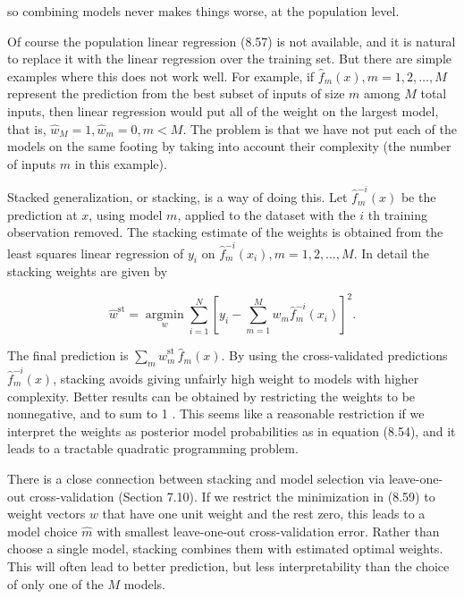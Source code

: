 \documentclass[10pt]{article}
\begin{document}
so combining models never makes things worse, at the population level.

Of course the population linear regression (8.57) is not available, and it is natural to replace it with the linear regression over the training set. But there are simple examples where this does not work well. For example, if $\hat{f}_{m}(x), m=1,2, \ldots, M$ represent the prediction from the best subset of inputs of size $m$ among $M$ total inputs, then linear regression would put all of the weight on the largest model, that is, $\hat{w}_{M}=1, \hat{w}_{m}=0, m<M$. The problem is that we have not put each of the models on the same footing by taking into account their complexity (the number of inputs $m$ in this example).

Stacked generalization, or stacking, is a way of doing this. Let $\hat{f}_{m}^{-i}(x)$ be the prediction at $x$, using model $m$, applied to the dataset with the $i$ th training observation removed. The stacking estimate of the weights is obtained from the least squares linear regression of $y_{i}$ on $\hat{f}_{m}^{-i}\left(x_{i}\right), m= 1,2, \ldots, M$. In detail the stacking weights are given by


\begin{equation*}
\hat{w}^{\mathrm{st}}=\underset{w}{\operatorname{argmin}} \sum_{i=1}^{N}\left[y_{i}-\sum_{m=1}^{M} w_{m} \hat{f}_{m}^{-i}\left(x_{i}\right)\right]^{2} . \tag{8.59}
\end{equation*}


The final prediction is $\sum_{m} \hat{w}_{m}^{\text {st }} \hat{f}_{m}(x)$. By using the cross-validated predictions $\hat{f}_{m}^{-i}(x)$, stacking avoids giving unfairly high weight to models with higher complexity. Better results can be obtained by restricting the weights to be nonnegative, and to sum to 1 . This seems like a reasonable restriction if we interpret the weights as posterior model probabilities as in equation (8.54), and it leads to a tractable quadratic programming problem.

There is a close connection between stacking and model selection via leave-one-out cross-validation (Section 7.10). If we restrict the minimization in (8.59) to weight vectors $w$ that have one unit weight and the rest zero, this leads to a model choice $\hat{m}$ with smallest leave-one-out cross-validation error. Rather than choose a single model, stacking combines them with estimated optimal weights. This will often lead to better prediction, but less interpretability than the choice of only one of the $M$ models.
\end{document}
